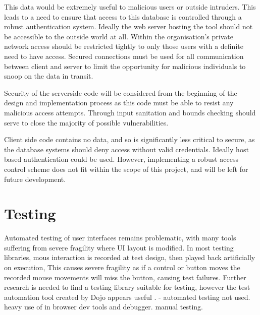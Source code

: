 This data would be extremely useful to malicious users or outside intruders. 
This leads to a need to ensure that access to this database is controlled through a robust authentication system.
Ideally the web server hosting the tool should not be accessible to the outside world at all. Within the organisation's private network access should be restricted tightly to only those users with a definite need to have access. 
Secured connections must be used for all communication between client and server to limit the opportunity for malicious individuals to snoop on the data in transit.

Security of the serverside code will be considered from the beginning of the design and implementation process
as this code must be able to resist any malicious access attempts. Through input sanitation and bounds checking should serve to close the majority of possible vulnerabilities.

Client side code contains no data, and so is significantly less critical to secure, as the database systems should deny access without valid credentials. Ideally host based authentication could be used. However, implementing a robust access control scheme does not fit within the scope of this project, and will be left for future development.


\section{Testing}
Automated testing of user interfaces remains problematic, with many tools suffering from severe fragility where UI layout is modified. In most testing libraries, mous interaction is recorded at test design, then played back artificially on execution, This causes severe fragility as if a control or button moves the recorded mouse movements will miss the button, causing test failures. Further research is needed to find a testing library suitable for testing, however the test automation tool created by Dojo appears useful \cite{dojo2013test}. - automated testing not used. heavy use of in browser dev tools and debugger. manual testing. 

